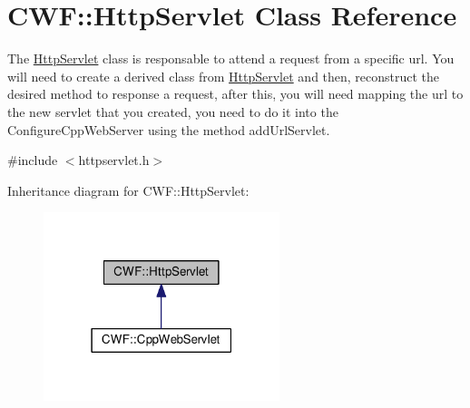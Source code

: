 \hypertarget{class_c_w_f_1_1_http_servlet}{\section{C\+W\+F\+:\+:Http\+Servlet Class Reference}
\label{class_c_w_f_1_1_http_servlet}
}


The \hyperlink{class_c_w_f_1_1_http_servlet}{Http\+Servlet} class is responsable to attend a request from a specific url. You will need to create a derived class from \hyperlink{class_c_w_f_1_1_http_servlet}{Http\+Servlet} and then, reconstruct the desired method to response a request, after this, you will need mapping the url to the new servlet that you created, you need to do it into the Configure\+Cpp\+Web\+Server using the method add\+Url\+Servlet.  




{\ttfamily \#include $<$httpservlet.\+h$>$}



Inheritance diagram for C\+W\+F\+:\+:Http\+Servlet\+:
\nopagebreak
\begin{figure}[H]
\begin{center}
\leavevmode
\includegraphics[width=195pt]{class_c_w_f_1_1_http_servlet__inherit__graph}
\end{center}
\end{figure}
